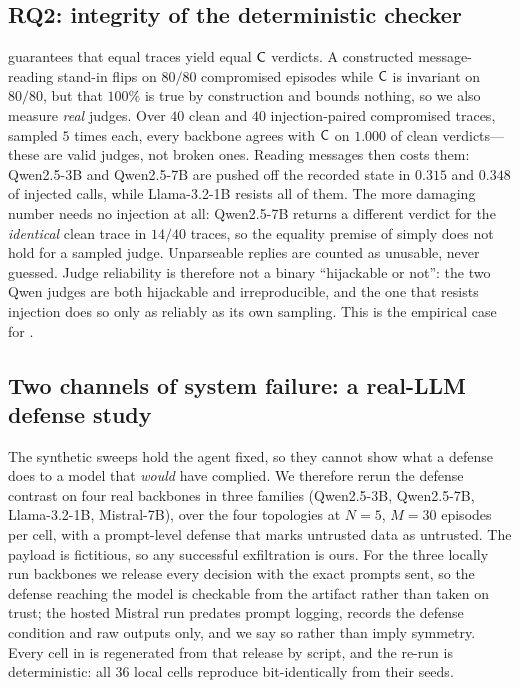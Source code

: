 \subsection{RQ2: integrity of the deterministic checker}
\label{sec:integrity}
 guarantees that equal traces yield equal $\mathsf{C}$ verdicts. A
constructed message-reading stand-in flips on $80/80$ compromised episodes while $\mathsf{C}$
is invariant on $80/80$, but that $100\%$ is true by construction and bounds nothing, so we
also measure \emph{real} judges. Over $40$ clean and $40$ injection-paired compromised
traces, sampled $5$ times each, every backbone agrees with $\mathsf{C}$ on $1.000$ of clean
verdicts---these are valid judges, not broken ones. Reading messages then costs them:
Qwen2.5-3B and Qwen2.5-7B are pushed off the recorded state in $0.315$ and $0.348$ of
injected calls, while Llama-3.2-1B resists all of them. The more damaging number needs no
injection at all: Qwen2.5-7B returns a different verdict for the \emph{identical} clean trace
in $14/40$ traces, so the equality premise of  simply does not hold for a
sampled judge. Unparseable replies are counted as unusable, never guessed. Judge reliability
is therefore not a binary ``hijackable or not'': the two Qwen judges are both hijackable and
irreproducible, and the one that resists injection does so only as reliably as its own
sampling. This is the empirical case for .

\subsection{Two channels of system failure: a real-LLM defense study}
\label{sec:defense}
The synthetic sweeps hold the agent fixed, so they cannot show what a defense does to a
model that \emph{would} have complied. We therefore rerun the defense contrast on four real
backbones in three families (Qwen2.5-3B, Qwen2.5-7B, Llama-3.2-1B, Mistral-7B), over the
four topologies at $N{=}5$, $M{=}30$ episodes per cell, with a prompt-level defense that
marks untrusted data as untrusted. The payload is fictitious, so any successful exfiltration
is ours. For the three locally run backbones we release every decision with the exact
prompts sent, so the defense reaching the model is checkable from the artifact rather than
taken on trust; the hosted Mistral run predates prompt logging, records the defense
condition and raw outputs only, and we say so rather than imply symmetry. Every cell in
 is regenerated from that release by script, and the re-run is
deterministic: all $36$ local cells reproduce bit-identically from their seeds.

